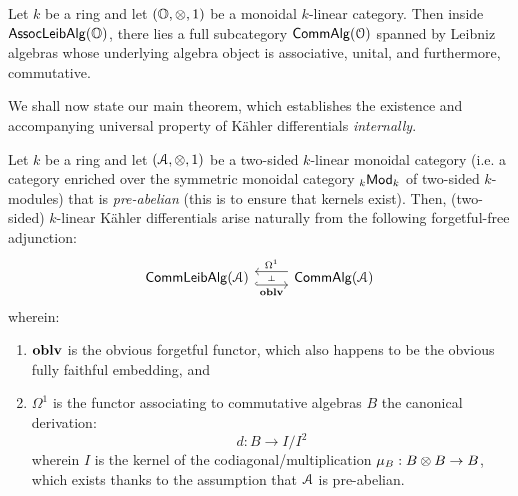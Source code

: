                 \begin{remark} \label{remark: commutative_leibniz_algebras}
                    Let $k$ be a ring and let $(\O, \tensor, 1)$ be a monoidal $k$-linear category. Then inside $\mathsf{Assoc}\mathsf{Leib}\mathsf{Alg}(\mathbb{O})$, there lies a full subcategory $\mathsf{Comm}\mathsf{Alg}(\mathcal{O})$ spanned by Leibniz algebras whose underlying algebra object is associative, unital, and furthermore, commutative.
                \end{remark}
                
                We shall now state our main theorem, which establishes the existence and accompanying universal property of K\"ahler differentials \textit{internally}.
                \begin{theorem} \label{theorem: kahler_differentials_universal_property}
                    Let $k$ be a ring and let $(\calA, \tensor, 1)$ be a two-sided $k$-linear monoidal category (i.e. a category enriched over the symmetric monoidal category ${}_k\mathsf{Mod}_k$ of two-sided $k$-modules) that is \textit{pre-abelian} (this is to ensure that kernels exist). Then, (two-sided) $k$-linear K\"ahler differentials arise naturally from the following forgetful-free adjunction:
                        $$
                            \begin{tikzcd}
                            	{\Comm\Leib\Alg(\calA)} & {\Comm\Alg(\calA)}
                            	\arrow[""{name=0, anchor=center, inner sep=0}, "\oblv"', shift right=2, hook, from=1-1, to=1-2]
                            	\arrow[""{name=1, anchor=center, inner sep=0}, "{\Omega^1}"', shift right=2, from=1-2, to=1-1]
                            	\arrow["\dashv"{anchor=center, rotate=-90}, draw=none, from=1, to=0]
                            \end{tikzcd}
                        $$
                    wherein:
                        \begin{enumerate}
                            \item $\mathbf{oblv}$ is the obvious forgetful functor, which also happens to be the obvious fully faithful embedding, and
                            \item $\Omega^1$ is the functor associating to commutative algebras $B$ the canonical derivation:
                                $$d: B \to I/I^2$$
                            wherein $I$ is the kernel of the codiagonal/multiplication $\mu_B: B \tensor B \to B$, which exists thanks to the assumption that $\mathcal{A}$ is pre-abelian.
                        \end{enumerate}
                \end{theorem}
